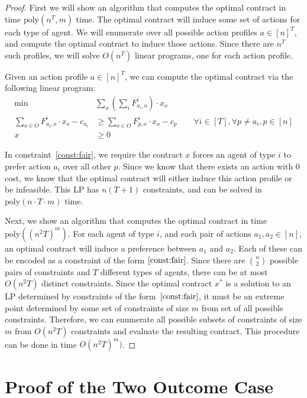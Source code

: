 \documentclass{article}
\newcommand{\poly}{\mathrm{poly}}
\begin{document}
\begin{proof}
First we will show an algorithm that computes the optimal contract in time $\poly(n^T,m)$ time. 
The optimal contract will induce some set of actions for each  type of agent.  We  will enumerate over all possible
action profiles $a \in [n]^T$, and compute the optimal contract to induce those actions. Since there are $n^T$ such profiles, 
we will solve $O(n^T)$ linear programs, one for each action profile. 

Given an action profile $a \in [n]^T$, we can compute the optimal contract via the following linear program:
\begin{align*}
\min  &\sum_o (\sum_i F^i_{a_i,o} ) \cdot x_o  \\
\sum_{o \in O} F^i_{a_i, o} \cdot x_o - c_{a_i} &\geq \sum_{o \in O} F^i_{p,o} \cdot x_o - c_{p} \qquad \forall i \in [T], \forall p \neq a_i, p \in [n]  \tag{P1} \label{const:fair} \\
   x &\geq 0 
\end{align*} 

In  constraint~\ref{const:fair}, we require the contract $x$ forces an agent of type $i$ 
to prefer action $a_i$ over all other $p$. Since we know that there exists an action with $0$ cost, we
know that the optimal contract will either induce this action profile or be infeasible. 
This LP has  $n(T+1)$ constraints, and can be solved in $\poly(n\cdot T \cdot m)$ time. 

Next, we show an algorithm that computes the optimal contract in time $\poly((n^2T)^m)$. 
For each agent of type $i$, and each pair of actions $a_1 , a_2 \in [n]$, an optimal contract will 
induce a preference between $a_1$ and $a_2$. Each of these can be encoded as a 
constraint of the form $\cref{const:fair}$. Since there are $\binom{n}{2}$ possible pairs of constraints and $T$ different types of agents, there can be at most $O(n^2T)$ distinct constraints. 
Since the optimal contract $x^*$ is a solution to an LP determined by constraints of the form~$\cref{const:fair}$, it must be an extreme point
 determined by some set of 
constraints of size $m$ from set of all possible constraints. Therefore, we can enumerate all possible subsets of constraints of size $m$ from $O(n^2T)$ constraints and evaluate the resulting contract. This procedure can be done in time $O(n^2T)^m)$. 
\end{proof}
\section{Proof of the Two Outcome Case}
\label{apx:two-outcome}
\end{document}
